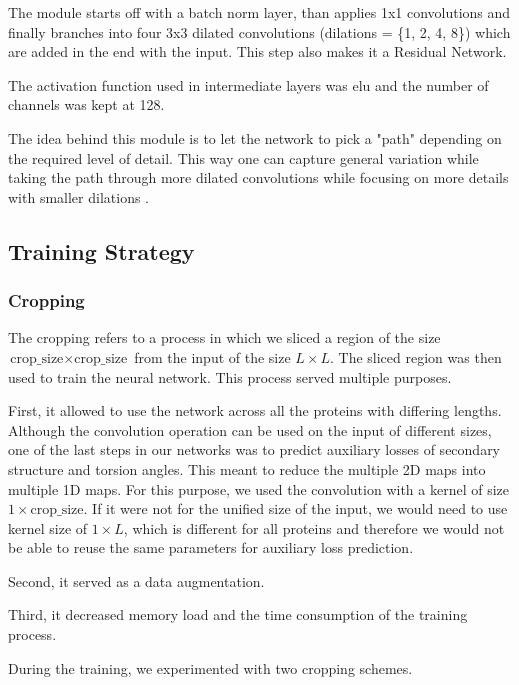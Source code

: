 The module starts off with a batch norm layer, than applies 1x1 convolutions and finally branches into four 3x3 dilated convolutions (dilations = \{1, 2, 4, 8\}) which are added in the end with the input. This step also makes it a Residual Network.

The activation function used in intermediate layers was elu and the number of channels was kept at 128.

The idea behind this module is to let the network to pick a "path" depending on the required level of detail. This way one can capture general variation while taking the path through more dilated convolutions while focusing on more details with smaller dilations \cite{nn_dl}.

\subsection{Training Strategy}

\subsubsection{Cropping}
The cropping refers to a process in which we sliced a region of the size $\text{crop\_size} \times \text{crop\_size}$ from the input of the size $L \times L$.
The sliced region was then used to train the neural network.
This process served multiple purposes.

First, it allowed to use the network across all the proteins with differing lengths.
Although the convolution operation can be used on the input of different sizes, one of the last steps in our networks was to predict auxiliary losses of secondary structure and torsion angles.
This meant to reduce the multiple 2D maps into multiple 1D maps.
For this purpose, we used the convolution with a kernel of size $1 \times \text{crop\_size}$.
If it were not for the unified size of the input, we would need to use kernel size of $1 \times L$, which is different for all proteins and therefore we would not be able to reuse the same parameters for auxiliary loss prediction.

Second, it served as a data augmentation.

Third, it decreased memory load and the time consumption of the training process.

During the training, we experimented with two cropping schemes.

